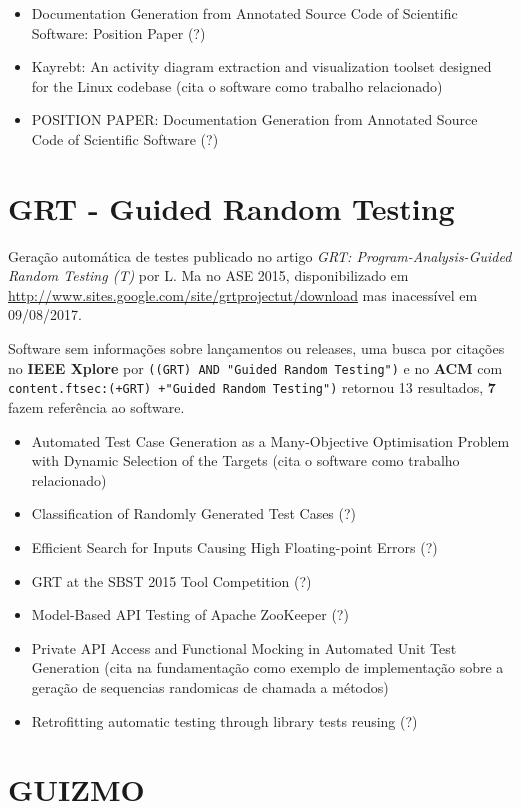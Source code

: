 \begin{itemize}
\item Documentation Generation from Annotated Source Code of Scientific Software: Position Paper (?)
\item Kayrebt: An activity diagram extraction and visualization toolset designed for the Linux codebase (cita o software como trabalho relacionado)
\item POSITION PAPER: Documentation Generation from Annotated Source Code of Scientific Software (?)
\end{itemize}

\section{GRT - Guided Random Testing}

Geração automática de testes
publicado no artigo {\it GRT: Program-Analysis-Guided Random Testing (T)}
por L. Ma
no ASE 2015,
disponibilizado em \url{http://www.sites.google.com/site/grtprojectut/download}
mas inacessível em 09/08/2017.

Software sem informações sobre lançamentos ou releases,
uma busca por citações no {\bf IEEE Xplore} por
\texttt{((GRT) AND "Guided Random Testing")}
e no {\bf ACM} com
\texttt{content.ftsec:(+GRT) +"Guided Random Testing")}
retornou
13 resultados,
{\bf 7} fazem referência ao software.

\begin{itemize}
\item Automated Test Case Generation as a Many-Objective Optimisation Problem with Dynamic Selection of the Targets (cita o software como trabalho relacionado)
\item Classification of Randomly Generated Test Cases (?)
\item Efficient Search for Inputs Causing High Floating-point Errors (?)
\item GRT at the SBST 2015 Tool Competition (?)
\item Model-Based API Testing of Apache ZooKeeper (?)
\item Private API Access and Functional Mocking in Automated Unit Test Generation (cita na fundamentação como exemplo de implementação sobre a geração de sequencias randomicas de chamada a métodos)
\item Retrofitting automatic testing through library tests reusing (?)
\end{itemize}

\section{GUIZMO}

